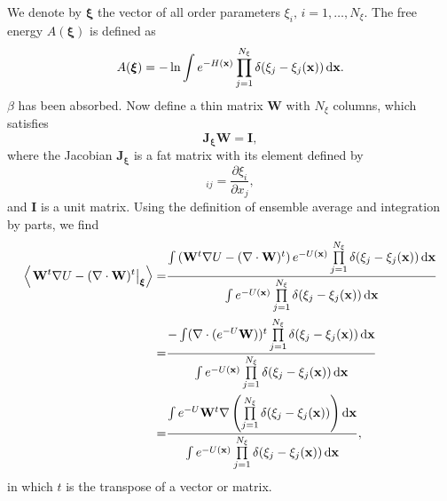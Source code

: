 We denote by $\boldsymbol{\xi}$ the vector of all order parameters $\xi_i,\,i=1,\dots,N_\xi$. The free energy $A(\boldsymbol{\xi})$ is defined as
\begin{equation}
    A(\boldsymbol{\xi})=-\ln\int e^{-H(\mathbf{x})}\prod_{j=1}^{N_\xi}\delta(\xi_j-\xi_j(\mathbf{x}))\mathop{}\!\mathrm{d} \mathbf{x}.
\end{equation}
$\beta$ has been absorbed. Now define a thin matrix $\mathbf{W}$ with $N_\xi$ columns, which satisfies
\begin{equation}
    \mathbf{J}_{\boldsymbol{\xi}} \mathbf{W}=\mathbf{I},
\end{equation} 
where the Jacobian $\mathbf{J}_{\boldsymbol{\xi}}$ is a fat matrix with its element defined by
\begin{equation}
    [\mathbf{J}_{\boldsymbol{\xi}}]_{ij}=\frac{\partial \xi_i}{\partial x_j},
\end{equation}
and $\mathbf{I}$ is a unit matrix. Using the definition of ensemble average and integration by parts, we find
\begin{align}
    \left<\left.\mathbf{W}^t\nabla U-(\nabla\cdot \mathbf{W})^t\right|_{\boldsymbol{\xi}}\right>=&\frac{\int\left(\mathbf{W}^t\nabla U-(\nabla\cdot \mathbf{W})^t\right)e^{-U(\mathbf{x})}\prod\limits_{j=1}^{N_\xi}\delta(\xi_j-\xi_j(\mathbf{x}))\mathop{}\!\mathrm{d} \mathbf{x}}{\int e^{-U(\mathbf{x})}\prod\limits_{j=1}^{N_\xi}\delta(\xi_j-\xi_j(\mathbf{x}))\mathop{}\!\mathrm{d} \mathbf{x}}\notag\\
    =&\frac{-\int (\nabla\cdot(e^{-U}\mathbf{W}))^t\prod\limits_{j=1}^{N_\xi}\delta(\xi_j-\xi_j(\mathbf{x}))\mathop{}\!\mathrm{d}\mathbf{x}}{\int e^{-U(\mathbf{x})}\prod\limits_{j=1}^{N_\xi}\delta(\xi_j-\xi_j(\mathbf{x}))\mathop{}\!\mathrm{d} \mathbf{x}}\notag\\
    =&\frac{\int e^{-U}\mathbf{W}^t\nabla\left(\prod\limits_{j=1}^{N_\xi}\delta(\xi_j-\xi_j(\mathbf{x}))\right)\mathop{}\!\mathrm{d} \mathbf{x}}{\int e^{-U(\mathbf{x})}\prod\limits_{j=1}^{N_\xi}\delta(\xi_j-\xi_j(\mathbf{x}))\mathop{}\!\mathrm{d} \mathbf{x}},
\end{align}
in which $t$ is the transpose of a vector or matrix.

